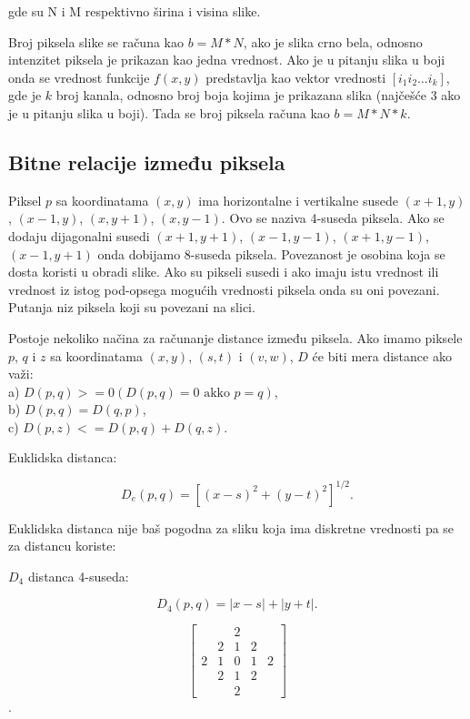 \documentclass[a4paper,12pt,titlepage]{article}
\begin{document}
gde su N i M respektivno širina i visina slike.

Broj piksela slike se računa kao $b = M * N$, ako je slika crno bela, odnosno intenzitet piksela je prikazan kao jedna vrednost. Ako je u pitanju slika u boji onda se vrednost funkcije $f(x, y)$ predstavlja kao vektor vrednosti $[i_{1} i_{2} \dots i_{k}]$, gde je $k$ broj kanala, odnosno broj boja kojima je prikazana slika (najčešće 3 ako je u pitanju slika u boji). Tada se broj piksela računa kao $b = M * N * k$.

\subsection{Bitne relacije između piksela}%

Piksel $p$ sa koordinatama $(x, y)$ ima horizontalne i vertikalne susede $(x + 1, y)$, $(x - 1, y)$, $(x, y + 1)$, $(x, y - 1)$. Ovo se naziva 4-suseda piksela. Ako se dodaju dijagonalni susedi $(x + 1, y + 1)$, $(x - 1, y - 1)$, $(x + 1, y - 1)$, $(x - 1, y + 1)$ onda dobijamo 8-suseda piksela. Povezanost je osobina koja se dosta koristi u obradi slike. Ako su pikseli susedi i ako imaju istu vrednost ili vrednost iz istog pod-opsega mogućih vrednosti piksela onda su oni povezani. Putanja niz piksela koji su povezani na slici.

Postoje nekoliko načina za računanje distance između piksela. Ako imamo piksele $p$, $q$ i $z$ sa koordinatama $(x, y)$, $(s, t)$ i $(v, w)$, $D$ će biti mera distance ako važi:\\

\noindent
a) $D(p, q) >= 0 (D(p, q) = 0 \text{ akko } p = q)$,\\
b) $D(p, q) = D(q, p)$,\\
c) $D(p, z) <= D(p, q) + D(q, z)$.

Euklidska distanca: 

\begin{equation}\label{eq:euclid}
D_{e}(p, q) = [ (x - s)^{2} + (y - t)^{2} ]^{1/2}.
\end{equation} 

Euklidska distanca nije baš pogodna za sliku koja ima diskretne vrednosti pa se za distancu koriste:

$D_{4}$ distanca 4-suseda:

\begin{equation}\label{eq:4ne}
D_{4}(p, q) = |x - s| + |y + t|.
\end{equation} 

\[
\begin{bmatrix}
& & 2 & & \\
& 2 & 1 & 2 & \\
2 & 1 & 0 & 1 & 2 \\
& 2 & 1 & 2 & \\
& & 2 & & 
\end{bmatrix}
\].
\end{document}
